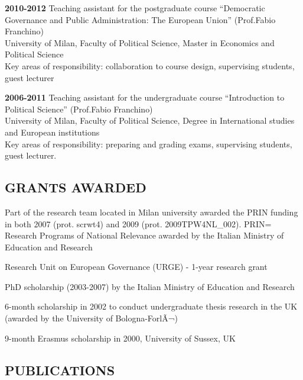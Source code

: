 \documentclass[11pt,]{article}
\renewenvironment{itemize}{
  \begin{list}{}{
    \setlength{\leftmargin}{1.5em}
  }
}{
  \end{list}
}
\begin{document}
\begin{itemize}
  \textbf{2010-2012} Teaching assistant for the postgraduate course
  ``Democratic Governance and Public Administration: The European
  Union'' (Prof.Fabio Franchino)\\
  University of Milan, Faculty of Political Science, Master in Economics
  and Political Science\\
  Key areas of responsibility: collaboration to course design,
  supervising students, guest lecturer
\item
  \textbf{2006-2011} Teaching assistant for the undergraduate course
  ``Introduction to Political Science'' (Prof.Fabio Franchino)\\
  University of Milan, Faculty of Political Science, Degree in
  International studies and European institutions\\
  Key areas of responsibility: preparing and grading exams, supervising
  students, guest lecturer.
\end{itemize}

\hypertarget{grants-awarded}{%
\subsection{GRANTS AWARDED}\label{grants-awarded}}

\begin{itemize}
\item
  Part of the research team located in Milan university awarded the PRIN
  funding in both 2007 (prot. scrwt4) and 2009 (prot. 2009TPW4NL\_002).
  PRIN= Research Programs of National Relevance awarded by the Italian
  Ministry of Education and Research
\item
  Research Unit on European Governance (URGE) - 1-year research grant
\item
  PhD scholarship (2003-2007) by the Italian Ministry of Education and
  Research
\item
  6-month scholarship in 2002 to conduct undergraduate thesis research
  in the UK (awarded by the University of Bologna-ForlÃ¬)
\item
  9-month Erasmus scholarship in 2000, University of Sussex, UK
\end{itemize}

\hypertarget{publications}{%
\subsection{PUBLICATIONS}\label{publications}}
\end{document}

